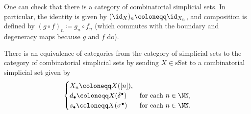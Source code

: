 \documentclass[../notes.tex]{subfiles}
\begin{document}
\begin{remark}
	One can check that there is a category of combinatorial simplicial sets. In particular, the identity is given by $({\id_X})_n\coloneqq\id_{X_n}$, and composition is defined by $(g\circ f)_n\coloneqq g_n\circ f_n$ (which commutes with the boundary and degeneracy maps because $g$ and $f$ do).
\end{remark}
\begin{proposition} \label{prop:sset-by-combo}
	There is an equivalence of categories from the category of simplicial sets to the category of combinatorial simplicial sets by sending $X\in\mathrm{sSet}$ to a combinatorial simplicial set given by
	\[\begin{cases}
		X_n\coloneqq X([n]), \\
		d_\bullet\coloneqq X(\delta^\bullet) & \text{for each }n\in\NN, \\
		s_\bullet\coloneqq X(\sigma^\bullet) & \text{for each }n\in\NN.
	\end{cases}\]
\end{proposition}
\end{document}
